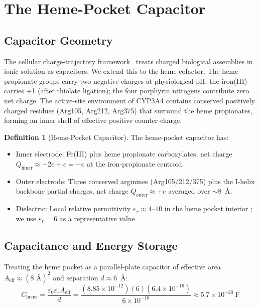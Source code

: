 \documentclass[11pt,twocolumn,a4paper]{article}
\theoremstyle{definition}
\newtheorem{definition}[theorem]{Definition}
\theoremstyle{remark}
\begin{document}
\section{The Heme-Pocket Capacitor}
\label{sec:heme_capacitor}

\subsection{Capacitor Geometry}

The cellular charge-trajectory framework~\citep{sachikonye2025_charge} treats charged biological assemblies in ionic solution as capacitors. We extend this to the heme cofactor. The heme propionate groups carry two negative charges at physiological pH; the iron(III) carries +1 (after thiolate ligation); the four porphyrin nitrogens contribute zero net charge. The active-site environment of CYP3A4 contains conserved positively charged residues (Arg105, Arg212, Arg375) that surround the heme propionates, forming an inner shell of effective positive counter-charge.

\begin{definition}[Heme-Pocket Capacitor]
\label{def:heme_cap}
The heme-pocket capacitor has:
\begin{itemize}[nosep]
\item Inner electrode: Fe(III) plus heme propionate carboxylates, net charge $Q_{\mathrm{inner}} \approx -2e + e = -e$ at the iron-propionate centroid.
\item Outer electrode: Three conserved arginines (Arg105/212/375) plus the I-helix backbone partial charges, net charge $Q_{\mathrm{outer}} \approx +e$ averaged over $\sim$8~\AA.
\item Dielectric: Local relative permittivity $\varepsilon_r \approx 4$--$10$ in the heme pocket interior \citep{warshel2006}; we use $\varepsilon_r = 6$ as a representative value.
\end{itemize}
\end{definition}

\subsection{Capacitance and Energy Storage}

Treating the heme pocket as a parallel-plate capacitor of effective area $A_{\mathrm{eff}} \approx (8 \text{ \AA})^2$ and separation $d \approx 6$~\AA:
\begin{equation}
C_{\mathrm{heme}} = \frac{\varepsilon_0 \varepsilon_r A_{\mathrm{eff}}}{d}
= \frac{(8.85 \times 10^{-12})(6)(6.4 \times 10^{-19})}{6 \times 10^{-10}}
\approx 5.7 \times 10^{-20}~\mathrm{F}
\label{eq:heme_cap}
\end{equation}
\end{document}
